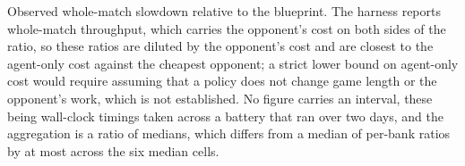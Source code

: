 \begin{table}[!ht]\centering
\caption{Observed whole-match slowdown relative to the blueprint. The harness reports whole-match
throughput, which carries the opponent's cost on both sides of the ratio, so these ratios are
diluted by the opponent's cost and are closest to the agent-only cost against the cheapest
opponent; a strict lower bound on agent-only cost would require assuming that a policy does not
change game length or the opponent's work, which is not established. No figure carries an interval,
these being wall-clock timings taken across a battery that ran over two days, and the aggregation is
a ratio of medians, which differs from a median of per-bank ratios by at most \vsevenCostAggDelta{}
across the six median cells.}
\label{tab:cost}
{\tabfont}
\end{table}
